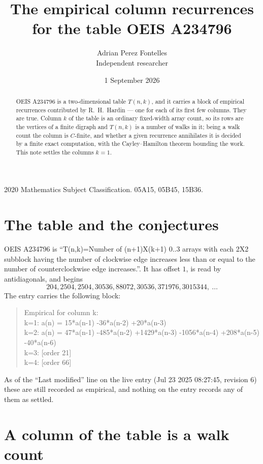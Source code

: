 \documentclass[11pt,a4paper]{article}
\title{The empirical column recurrences for the table OEIS A234796}
\author{Adrian Perez Fontelles\\ \small Independent researcher}
\date{1 September 2026}
\theoremstyle{plain}
\theoremstyle{definition}
\begin{document}
\maketitle

\begin{abstract}
OEIS A234796 is a two-dimensional table $T(n,k)$, and it carries a block of empirical
recurrences contributed by R.~H.~Hardin --- one for each of its first few columns. They are
true. Column $k$ of the table is an ordinary fixed-width array count, so its rows are the
vertices of a finite digraph and $T(n,k)$ is a number of walks in it; being a walk count the
column is $C$-finite, and whether a given recurrence annihilates it is decided by a finite
exact computation, with the Cayley--Hamilton theorem bounding the work. This note settles the columns $k=1$.
\end{abstract}

\noindent\small 2020 Mathematics Subject Classification. 05A15, 05B45, 15B36.\normalsize

\section{The table and the conjectures}

OEIS A234796 is ``T(n,k)=Number of (n+1)X(k+1) 0..3 arrays with each 2X2 subblock having the number of clockwise edge increases less than or equal to the number of counterclockwise edge increases.''. It has offset $1$, is
read by antidiagonals, and begins
\[
204, 2504, 2504, 30536, 88072, 30536, 371976, 3015344,\ \dots
\]
The entry carries the following block:
\begin{quote}\small
Empirical for column k:\\
k=1: a(n) = 15*a(n-1) -36*a(n-2) +20*a(n-3)\\
k=2: a(n) = 47*a(n-1) -485*a(n-2) +1429*a(n-3) -1056*a(n-4) +208*a(n-5) -40*a(n-6)\\
k=3: [order 21]\\
k=4: [order 66]\\
\end{quote}
As of the ``Last modified'' line on the live entry (Jul 23 2025 08:27:45, revision 6) these are still
recorded as empirical, and nothing on the entry records any of them as settled.

\section{A column of the table is a walk count}
\end{document}
